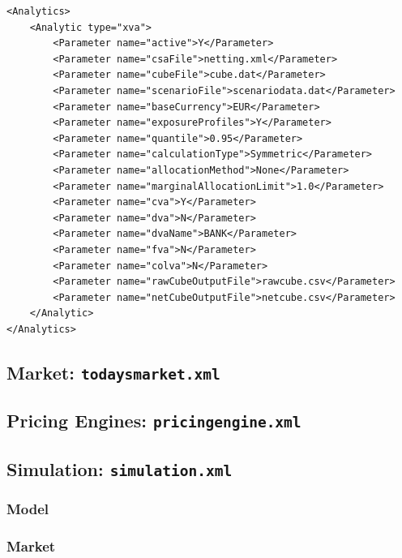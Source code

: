 \documentclass[12pt, a4paper]{article}
\begin{document}
\begin{lstlisting}[caption={ORE analytic: xva},
 	label=lst:ore_xva]
<Analytics>
	<Analytic type="xva">
		<Parameter name="active">Y</Parameter>
		<Parameter name="csaFile">netting.xml</Parameter>
		<Parameter name="cubeFile">cube.dat</Parameter>
		<Parameter name="scenarioFile">scenariodata.dat</Parameter>
		<Parameter name="baseCurrency">EUR</Parameter>
		<Parameter name="exposureProfiles">Y</Parameter>
		<Parameter name="quantile">0.95</Parameter>
		<Parameter name="calculationType">Symmetric</Parameter>      
		<Parameter name="allocationMethod">None</Parameter>    
		<Parameter name="marginalAllocationLimit">1.0</Parameter>    
		<Parameter name="cva">Y</Parameter>
		<Parameter name="dva">N</Parameter>
		<Parameter name="dvaName">BANK</Parameter>
		<Parameter name="fva">N</Parameter>
		<Parameter name="colva">N</Parameter>
		<Parameter name="rawCubeOutputFile">rawcube.csv</Parameter>
		<Parameter name="netCubeOutputFile">netcube.csv</Parameter>     
	</Analytic>
</Analytics>
\end{lstlisting}

\subsection{Market: {\tt todaysmarket.xml}}\label{sec:market}

\subsection{Pricing Engines: {\tt pricingengine.xml}}

\subsection{Simulation: {\tt simulation.xml}}
\subsubsection{Model}\label{sec:sim_model}
\subsubsection{Market}\label{sec:sim_market}
\end{document}
